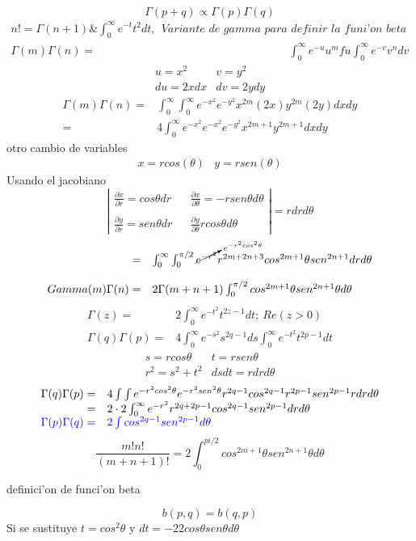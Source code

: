 \documentclass{article}
\theoremstyle{definition}
\begin{document}
\[\Gamma (p+q)\propto \Gamma (p)\Gamma (q)\]
\[
\begin{array}{rl}
	n!= \Gamma (n+1)\& \int^{\infty}_0 e^{-t}t^2 dt,\ \ \textit{Variante de gamma para definir la funi'on beta}\\
	\Gamma (m)\Gamma (n)=& \int^{\infty}_0 e^{-u}u^m fu\int^{\infty}_0 e^{-v}v^n dv
\end{array}
\]
\[
\begin{array}{cc}
	u=x^2 & v=y^2\\
	du=2xdx & dv= 2ydy
\end{array}
\]
\[
\begin{array}{rl}
	\Gamma (m)\Gamma (n) =& \int^{\infty}_0 \int^{\infty}_0e^{-x^{2}}e^{-y^{2}}x^{2m}(2x)y^{2m}(2y)dxdy\\
	=& 4\int^{\infty}_0 e^{-x^{2}} e^{-x^{2}}e^{-y^{2}}x^{2m+1}y^{2m+1}dxdy
\end{array}
\]
otro cambio de variables
\[
\begin{array}{cc}
	x=rcos(\theta) & y=rsen(\theta)
\end{array}
\]
Usando el jacobiano
\[
\left|
\begin{array}{ccc}
	\frac{\partial x}{\partial r}= cos\theta dr && \frac{\partial x}{\partial \theta} =-rsen\theta d\theta\\
	\\
	\frac{\partial y}{\partial r} = sen\theta dr && \frac{\partial y}{\partial \theta} r cos\theta d\theta
\end{array}\right|
=rdrd\theta
\]
\[
\begin{array}{rl}
	=& \int^{\infty}_0\int^{\pi/2}_0 \cancelto{e^{-r^2cos^2\theta}}{e^{-r^2}} r^{2m+2n+3} cos^{2m+1}\theta sen ^{2n+1}drd\theta\\
	\\Gamma (m)\Gamma (n) =& 2 \Gamma (m+n+1)\int^{\pi/2}_0 cos^{2m+1}\theta sen^{2n+1}\theta d\theta
\end{array}
\]
\[
\begin{array}{rl}
	\Gamma (z)=& 2 \int^{\infty}_0 e^{-t^2}t^{2z-1}dt;\ Re(z>0)\\
	\Gamma (q)\Gamma (p) =& 4\int^{\infty}_0 e^{-s^2} s^{2q-1}ds\int^{\infty}_0 e^{-t^2}t^{2p-1}dt
\end{array}
\]
\[
\begin{array}{cc}
	s=rcos\theta & t=rsen\theta\\
	r^2=s^2+t^2 & dsdt=rdrd\theta
\end{array}
\]
\[
\begin{array}{rl}
	\Gamma (q)\Gamma (p)=& 4\int\int e^{-r^2cos^2\theta}e^{-r^2sen^2\theta}r^{2q-1}cos^{2q-1}r^{2p-1}sen^{2p-1}rdrd\theta\\
	=& 2\cdot 2 \int^{\infty}_0 e^{-r^2}r^{2q+2p-1}cos^{2q-1}sen^{2p-1}drd\theta\\
	\textcolor{blue}{\Gamma (p)\Gamma (q)=}&\textcolor{blue}{2\int cos^{2q-1}sen^{2p-1} d\theta}
\end{array}
\]
\[\frac{m! n!}{(m+n+1)!}=2\int^{pi /2}_0 cos^{2m+1}\theta sen^{2n+1}\theta d \theta\]

\begin{center}
\fbox{\begin{minipage}{15em}
  \[b(p,q)=\frac{\Gamma (q)\Gamma (p)}{\Gamma (q+p)}\]
\end{minipage}} definici'on de funci'on beta
\end{center}
\[b(p,q)=b(q,p)\]
Si se sustituye $t=cos^2\theta$ y $dt=-2 2cos\theta sen\theta d\theta$
\end{document}
